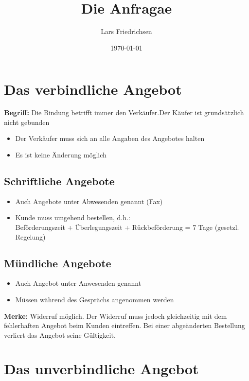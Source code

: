 \documentclass[a4paper,11pt]{scrartcl}	%
\title{Die Anfragae}
\author{Lars Friedrichsen}
\date{\today}
\begin{document}
\section{Das verbindliche Angebot}

\textbf{Begriff:} Die Bindung betrifft immer den Verkäufer.Der Käufer ist grundsätzlich nicht gebunden
	
	\begin{itemize}
		\item Der Verkäufer muss sich an alle Angaben des Angebotes halten
		\item Es ist keine Änderung möglich
	\end{itemize}
	
	\subsection{Schriftliche Angebote}
	\begin{itemize}
		\item Auch Angebote unter Abwesenden genannt (Fax)
		\item Kunde muss umgehend bestellen, d.h.:\\
		Beförderungszeit + Überlegungszeit + Rückbeförderung = 7 Tage (gesetzl. Regelung)
	\end{itemize}
	
	\subsection{Mündliche Angebote}
	\begin{itemize}
		\item Auch Angebot unter Anwesenden genannt
		\item Müssen während des Gesprächs angenommen werden
	\end{itemize}
	\textbf{Merke:} Widerruf möglich. Der Widerruf muss jedoch gleichzeitig mit dem fehlerhaften Angebot
	beim Kunden eintreffen. Bei einer abgeänderten Bestellung verliert das Angebot seine Gültigkeit.

\section{Das unverbindliche Angebot}
\end{document}
